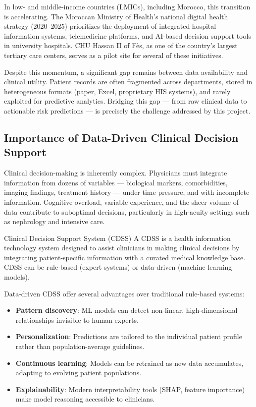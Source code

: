 \documentclass[12pt,a4paper,twoside]{report}
\begin{document}
In low- and middle-income countries (LMICs), including Morocco, this transition is accelerating. The Moroccan Ministry of Health's national digital health strategy (2020--2025) prioritizes the deployment of integrated hospital information systems, telemedicine platforms, and AI-based decision support tools in university hospitals. CHU Hassan II of Fès, as one of the country's largest tertiary care centers, serves as a pilot site for several of these initiatives.

Despite this momentum, a significant gap remains between data availability and clinical utility. Patient records are often fragmented across departments, stored in heterogeneous formats (paper, Excel, proprietary HIS systems), and rarely exploited for predictive analytics. Bridging this gap — from raw clinical data to actionable risk predictions — is precisely the challenge addressed by this project.

\subsection{Importance of Data-Driven Clinical Decision Support}

Clinical decision-making is inherently complex. Physicians must integrate information from dozens of variables — biological markers, comorbidities, imaging findings, treatment history — under time pressure, and with incomplete information. Cognitive overload, variable experience, and the sheer volume of data contribute to suboptimal decisions, particularly in high-acuity settings such as nephrology and intensive care.

\begin{definitionbox}{Clinical Decision Support System (CDSS)}
A CDSS is a health information technology system designed to assist clinicians in making clinical decisions by integrating patient-specific information with a curated medical knowledge base. CDSS can be rule-based (expert systems) or data-driven (machine learning models).
\end{definitionbox}

Data-driven CDSS offer several advantages over traditional rule-based systems:
\begin{itemize}
  \item \textbf{Pattern discovery}: ML models can detect non-linear, high-dimensional relationships invisible to human experts.
  \item \textbf{Personalization}: Predictions are tailored to the individual patient profile rather than population-average guidelines.
  \item \textbf{Continuous learning}: Models can be retrained as new data accumulates, adapting to evolving patient populations.
  \item \textbf{Explainability}: Modern interpretability tools (SHAP, feature importance) make model reasoning accessible to clinicians.
\end{itemize}
\end{document}

